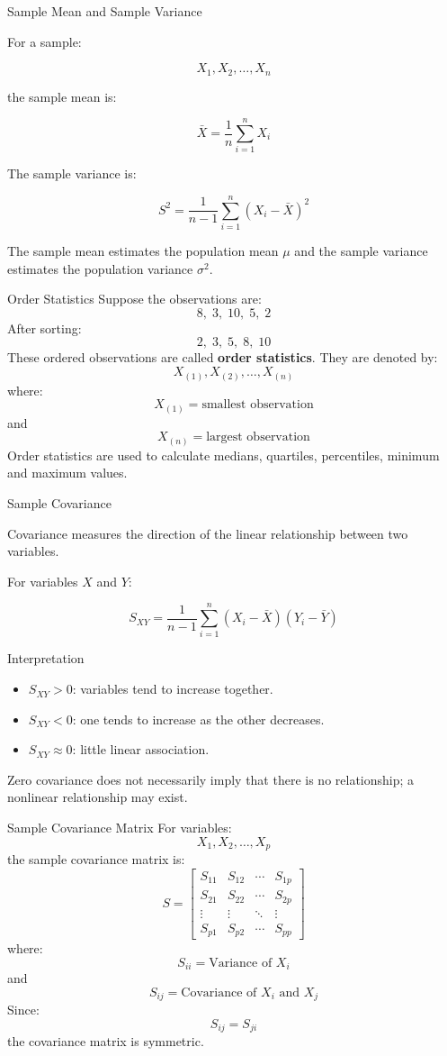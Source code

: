 \documentclass[aspectratio=169]{beamer}
\begin{document}
\begin{frame}{Sample Mean and Sample Variance}

For a sample:

\[
X_1,X_2,\ldots,X_n
\]

the sample mean is:

\[
\boxed{
\bar X=
\frac{1}{n}\sum_{i=1}^{n}X_i
}
\]

The sample variance is:

\[
\boxed{
S^2=
\frac{1}{n-1}
\sum_{i=1}^{n}(X_i-\bar X)^2
}
\]

The sample mean estimates the population mean $\mu$ and
the sample variance estimates the population variance $\sigma^2$.
\end{frame}

\begin{frame}{Order Statistics}
Suppose the observations are:
\[
8,\;3,\;10,\;5,\;2
\]
After sorting:
\[
2,\;3,\;5,\;8,\;10
\]
These ordered observations are called \textbf{order statistics}.
They are denoted by:
\[
X_{(1)},X_{(2)},\ldots,X_{(n)}
\]
where:
\[
X_{(1)}=\text{smallest observation}
\]
and
\[
X_{(n)}=\text{largest observation}
\]
Order statistics are used to calculate medians, quartiles,
percentiles, minimum and maximum values.
\end{frame}

\begin{frame}{Sample Covariance}

Covariance measures the direction of the linear relationship
between two variables.

For variables $X$ and $Y$:

\[
\boxed{
S_{XY}
=
\frac{1}{n-1}
\sum_{i=1}^{n}
(X_i-\bar X)(Y_i-\bar Y)
}
\]

\begin{block}{Interpretation}
\begin{itemize}
    \item $S_{XY}>0$: variables tend to increase together.
    \item $S_{XY}<0$: one tends to increase as the other decreases.
    \item $S_{XY}\approx0$: little linear association.
\end{itemize}
\end{block}

Zero covariance does not necessarily imply that there is
no relationship; a nonlinear relationship may exist.
\end{frame}

\begin{frame}{Sample Covariance Matrix}
For variables:
\[
X_1,X_2,\ldots,X_p
\]
the sample covariance matrix is:
\[
\boxed{
S=
\begin{bmatrix}
S_{11} & S_{12} & \cdots & S_{1p}\\
S_{21} & S_{22} & \cdots & S_{2p}\\
\vdots & \vdots & \ddots & \vdots\\
S_{p1} & S_{p2} & \cdots & S_{pp}
\end{bmatrix}
}
\]
where:
\[
S_{ii}=\text{Variance of }X_i
\]
and
\[
S_{ij}=\text{Covariance of }X_i\text{ and }X_j
\]
Since:
\[
S_{ij}=S_{ji}
\]
the covariance matrix is symmetric.
\end{frame}
\end{document}
